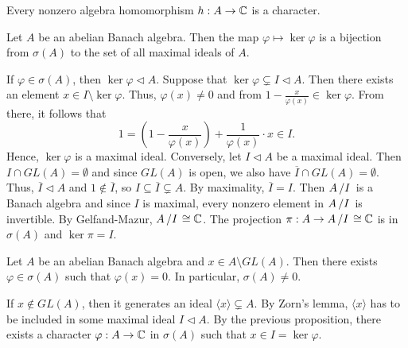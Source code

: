 \begin{corollary}
  Every nonzero algebra homomorphism $h: A \to \mathbb {C}$ is a character.
\end{corollary}

\begin{proposition}
  Let $A$ be an abelian Banach algebra. Then the map $\varphi \mapsto \ker \varphi$
  is a bijection from $\sigma (A)$ to the set of all maximal ideals of $A$.
\end{proposition}

\begin{myproof}
  If $\varphi \in \sigma (A)$, then $\ker \varphi \lhd A$. Suppose that $\ker \varphi \subsetneq I \lhd A$. Then there exists
  an element $x \in I \setminus \ker \varphi$. Thus, $\varphi(x) \neq 0$ and 
  from $1 - \frac{x}{\varphi(x)} \in \ker \varphi$. From there, it follows that 
  $$1 = \left(1 - \frac{x}{\varphi(x)}\right) + \frac{1}{\varphi(x)} \cdot x \in I.$$
  Hence, $\ker \varphi$ is a maximal ideal.
  Conversely, let $I \lhd A$ be a maximal ideal. Then $I \cap GL(A) = \emptyset$
  and since $GL(A)$ is open, we also have $\overline{I} \cap GL(A) = \emptyset$.
  Thus, $\overline{I} \lhd A$ and $1 \notin \overline{I}$, so $I \subseteq \overline{I} \subsetneq A$.
  By maximality, $\overline{I} = I$. Then $\quot{A}{I}$ is a Banach algebra and since $I$ is maximal,
  every nonzero element in $\quot{A}{I}$ is invertible. By Gelfand-Mazur, $\quot{A}{I} \cong \C$.
  The projection $\pi: A \to \quot{A}{I} \cong \C$ is in $\sigma (A)$ and $\ker \pi = I$.
\end{myproof}

\begin{corollary}\label{cor:1}
  Let $A$ be an abelian Banach algebra and $x \in A \setminus GL(A)$.
  Then there exists $\varphi \in \sigma(A)$ such that $\varphi(x) = 0$.
  In particular, $\sigma(A) \neq 0$.
\end{corollary}

\begin{myproof}
  If $x \notin GL(A)$, then it generates an ideal $\langle x \rangle \subsetneq A$.
  By Zorn's lemma, $\langle x \rangle$ has to be included in some maximal ideal $I \lhd A$.
  By the previous proposition, there exists a character $\varphi: A \to \mathbb {C}$ in $\sigma (A)$
  such that $x \in I = \ker \varphi$.
\end{myproof}

